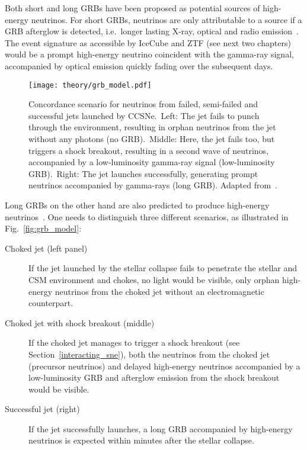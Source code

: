 Both short and long GRBs have been proposed as potential sources of high-energy neutrinos. For short GRBs, neutrinos are only attributable to a source if a GRB afterglow is detected, i.e.\ longer lasting X-ray, optical and radio emission~. The event signature as accessible by IceCube and ZTF (see next two chapters) would be a prompt high-energy neutrino coincident with the gamma-ray signal, accompanied by optical emission quickly fading over the subsequent days.

\begin{figure*}[htb]
    \texttt{[image: theory/grb\_model.pdf]}
    \caption[High-energy neutrinos from GRBs]{Concordance scenario for neutrinos from failed, semi-failed and successful jets launched by CCSNe.\ Left: The jet fails to punch through the environment, resulting in orphan neutrinos from the jet without any photons (no GRB).\ Middle: Here, the jet fails too, but triggers a shock breakout, resulting in a second wave of neutrinos, accompanied by a low-luminosity gamma-ray signal (low-luminosity GRB).\ Right: The jet launches successfully, generating prompt neutrinos accompanied by gamma-rays (long GRB). Adapted from~\cite{Senno2016}.}
\end{figure*}

Long GRBs on the other hand are also predicted to produce high-energy neutrinos~. One needs to distinguish three different scenarios, as illustrated in Fig.~\ref{fig:grb_model}:
\begin{description}
    \item[Choked jet (left panel)] If the jet launched by the stellar collapse fails to penetrate the stellar and CSM environment and chokes, no light would be visible, only orphan high-energy neutrinos from the choked jet without an electromagnetic counterpart.
    \item[Choked jet with shock breakout (middle)] If the choked jet manages to trigger a shock breakout (see Section~\ref{interacting_sne}), both the neutrinos from the choked jet (precursor neutrinos) and delayed high-energy neutrinos accompanied by a low-luminosity GRB and afterglow emission from the shock breakout would be visible.
    \item[Successful jet (right)] If the jet successfully launches, a long GRB accompanied by high-energy neutrinos is expected within minutes after the stellar collapse.
\end{description}

